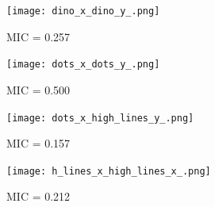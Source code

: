 		\begin{figure}[H]
		\centering
		\texttt{[image: dino\_x\_dino\_y\_.png]}
		\caption{ MIC = 0.257}
		\end{figure}
		
		\begin{figure}[H]
		\centering
		\texttt{[image: dots\_x\_dots\_y\_.png]}
		\caption{ MIC = 0.500}
		\end{figure}
		
		\begin{figure}[H]
		\centering
		\texttt{[image: dots\_x\_high\_lines\_y\_.png]}
		\caption{ MIC = 0.157}
		\end{figure}
		
		\begin{figure}[H]
		\centering
		\texttt{[image: h\_lines\_x\_high\_lines\_x\_.png]}
		\caption{ MIC = 0.212}
		\end{figure}

		